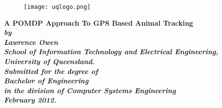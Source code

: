 \documentclass[12pt,openany,a4paper]{book}
\renewcommand{\baselinestretch}{1.2}	%
\begin{document}
\frontmatter

\begin{titlepage}
\renewcommand{\baselinestretch}{1.0}
\begin{center}
\begin{figure} [htbp]
\begin{center}
\texttt{[image: uqlogo.png]}
\end{center}
\end{figure}
\vspace*{35mm}
\Huge\bf
		A POMDP Approach To GPS Based Animal Tracking\\
		
\vspace{20mm}
\large\sl
		by\\
		Lawrence Owen
		\medskip\\
\rm
		School of Information Technology and Electrical Engineering,\\
		University of Queensland.\\
\vspace{30mm}
		Submitted for the degree of\\
		Bachelor of Engineering
		\smallskip\\
\normalsize
		in the division of Computer Systems Engineering
		\medskip\\
\large
		February 2012.		
\end{center}
\end{titlepage}



\newpage




\newpage
\tableofcontents



% 


\mainmatter


%
%
%
%	
%	
\end{document}
